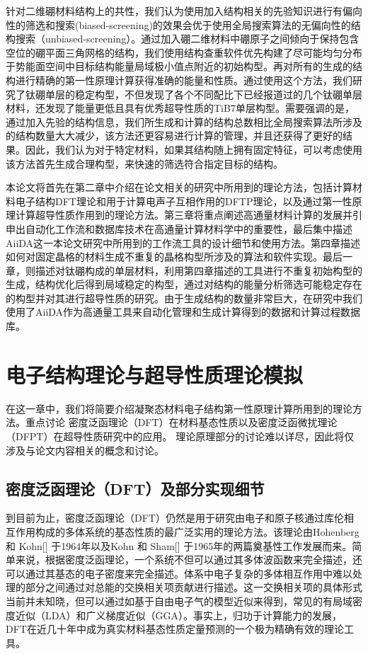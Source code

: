 \documentclass[phd,nobackinfo]{scutthesis}
\begin{document}
针对二维硼材料结构上的共性，我们认为使用加入结构相关的先验知识进行有偏向性的筛选和搜索(biased-screening)的效果会优于使用全局搜索算法的无偏向性的结构搜索（unbiased-screening）。通过加入硼二维材料中硼原子之间倾向于保持包含空位的硼平面三角网格的结构，我们使用结构查重软件优先构建了尽可能均匀分布于势能面空间中目标结构能量局域极小值点附近的初始构型。再对所有的生成的结构进行精确的第一性原理计算获得准确的能量和性质。通过使用这个方法，我们研究了钛硼单层的稳定构型，不但发现了各个不同配比下已经报道过的几个钛硼单层材料，还发现了能量更低且具有优秀超导性质的TiB7单层构型。需要强调的是，通过加入先验的结构信息，我们所生成和计算的结构总数相比全局搜索算法所涉及的结构数量大大减少，该方法还更容易进行计算的管理，并且还获得了更好的结果。因此，我们认为对于特定材料，如果其结构随上拥有固定特征，可以考虑使用该方法首先生成合理构型，来快速的筛选符合指定目标的结构。

本论文将首先在第二章中介绍在论文相关的研究中所用到的理论方法，包括计算材料电子结构DFT理论和用于计算电声子互相作用的DFTP理论，以及通过第一性原理计算超导性质作用到的理论方法。第三章将重点阐述高通量材料计算的发展并引申出自动化工作流和数据库技术在高通量计算材料学中的重要性，最后集中描述AiiDA这一本论文研究中所用到的工作流工具的设计细节和使用方法。第四章描述如何对固定晶格的材料生成不重复的晶格构型所涉及的算法和软件实现。最后一章，则描述对钛硼构成的单层材料，利用第四章描述的工具进行不重复初始构型的生成，结构优化后得到局域稳定的构型，通过对结构的能量分析筛选可能稳定存在的构型并对其进行超导性质的研究。由于生成结构的数量非常巨大，在研究中我们使用了AiiDA作为高通量工具来自动化管理和生成计算得到的数据和计算过程数据库。

\chapter{电子结构理论与超导性质理论模拟}\label{chapter_theory}
\newcommand{\ubm}[1]{\underline{\bm{#1}}}

在这一章中，我们将简要介绍凝聚态材料电子结构第一性原理计算所用到的理论方法。重点讨论
密度泛函理论（DFT）在材料基态性质以及密度泛函微扰理论（DFPT）在超导性质研究中的应用。
理论原理部分的讨论难以详尽，因此将仅涉及与论文内容相关的概念和讨论。

\section{密度泛函理论（DFT）及部分实现细节}

到目前为止，密度泛函理论（DFT）仍然是用于研究由电子和原子核通过库伦相互作用构成的多体系统的基态性质的最广泛实用的理论方法。该理论由Hohenberg 和 Kohn[] 于1964年以及Kohn 和 Sham[] 于1965年的两篇奠基性工作发展而来。简单来说，根据密度泛函理论，一个系统不但可以通过其多体波函数来完全描述，还可以通过其基态的电子密度来完全描述。体系中电子复杂的多体相互作用中难以处理的部分之间通过对总能的交换相关项贡献进行描述。这一交换相关项的具体形式当前并未知晓，但可以通过如基于自由电子气的模型近似来得到，常见的有局域密度近似（LDA）和广义梯度近似（GGA）。事实上，归功于计算能力的发展，DFT在近几十年中成为真实材料基态性质定量预测的一个极为精确有效的理论工具。
\end{document}
